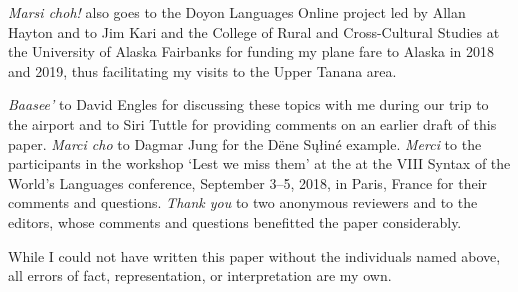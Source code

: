 \documentclass[output=paper,colorlinks,citecolor=brown
]{langscibook}
\begin{document}
\textit{Marsi choh!} also goes to the Doyon Languages Online project led by Allan Hayton and to Jim Kari and the College of Rural and Cross-Cultural Studies at the University of Alaska Fairbanks for funding my plane fare to Alaska in 2018 and 2019, thus facilitating my visits to the Upper Tanana area.

\textit{Baasee'} to David Engles for discussing these topics with me during our trip to the airport and to Siri Tuttle for providing comments on an earlier draft of this paper. \textit{Marci cho} to Dagmar Jung for the Dëne Sųłiné example. \textit{Merci} to the participants in the workshop `Lest we miss them' at the at the VIII Syntax of the World's Languages conference, September 3–5, 2018, in Paris, France for their comments and questions. \textit{Thank you} to two anonymous reviewers and to the editors, whose comments and questions benefitted the paper considerably.

While I could not have written this paper without the individuals named above, all errors of fact, representation, or interpretation are my own.

\printbibliography[heading=subbibliography,notkeyword=this]
\end{document}
